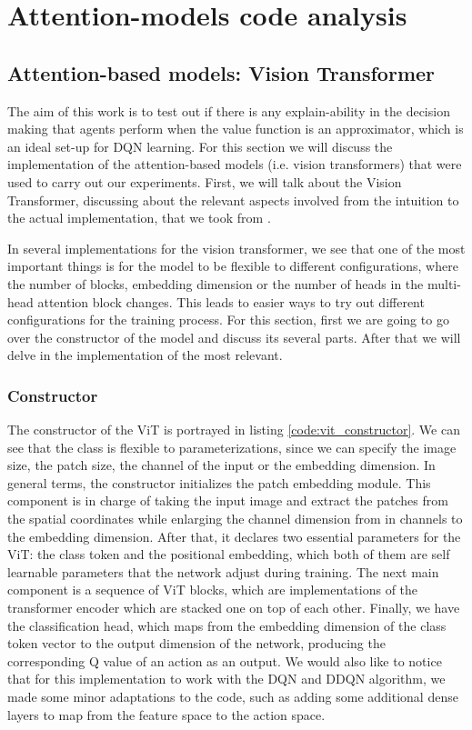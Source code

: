 \chapter{Attention-models code analysis}
\label{cha:attn_models_code_analysis}

\section{Attention-based models: Vision Transformer}
\label{sec:vit_transformer_imp}
The aim of this work is to test out if there is any explain-ability in the decision making that agents perform when the value function is an approximator, which is an ideal set-up for DQN learning. For this section we will discuss the implementation of the attention-based models (i.e. vision transformers) that were used to carry out our experiments. First, we will talk about the Vision Transformer, discussing about the relevant aspects involved from the intuition to the actual implementation, that we took from \cite{caron2021emerging}. 

In several implementations for the vision transformer, we see that one of the most important things is for the model to be flexible to different configurations, where the number of blocks, embedding dimension or the number of heads in the multi-head attention block changes. This leads to easier ways to try out different configurations for the training process. For this section, first we are going to go over the constructor of the model and discuss its several parts. After that we will delve in the implementation of the most relevant.

\subsection{Constructor}
The constructor of the ViT is portrayed in listing \ref{code:vit_constructor}. We can see that the class is flexible to parameterizations, since we can specify the image size, the patch size, the channel of the input or the embedding dimension. In general terms, the constructor initializes the patch embedding module. This component is in charge of taking the input image and extract the patches from the spatial coordinates while enlarging the channel dimension from in channels to the embedding dimension. After that, it declares two essential parameters for the ViT: the class token and the positional embedding, which both of them are self learnable parameters that the network adjust during training. The next main component is a sequence of ViT blocks, which are implementations of the transformer encoder which are stacked one on top of each other. Finally, we have the classification head, which maps from the embedding dimension of the class token vector to the output dimension of the network, producing the corresponding Q value of an action as an output. We would also like to notice that for this implementation to work with the DQN and DDQN algorithm, we made some minor adaptations to the code, such as adding some additional dense layers to map from the feature space to the action space.

